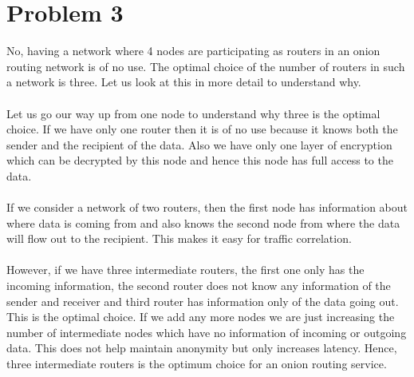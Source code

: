\documentclass[10pt]{article}
\begin{document}
\section{Problem 3}
No, having a network where 4 nodes are participating as routers in an onion routing network is of no use. The optimal choice of the number of routers in such a network is three. Let us look at this in more detail to understand why.\\\\
Let us go our way up from one node to understand why three is the optimal choice. If we have only one router then it is of no use because it knows both the sender and the recipient of the data. Also we have only one layer of encryption which can be decrypted by this node and hence this node has full access to the data.\\\\
If we consider a network of two routers, then the first node has information about where data is coming from and also knows the second node from where the data will flow out to the recipient. This makes it easy for traffic correlation.\\\\
However, if we have three intermediate routers, the first one only has the incoming information, the second router does not know any information of the sender and receiver and third router has information only of the data going out. This is the optimal choice. If we add any more nodes we are just increasing the number of intermediate nodes which have no information of incoming or outgoing data. This does not help maintain anonymity but only increases latency. Hence, three intermediate routers is the optimum choice for an onion routing service.
\end{document}
